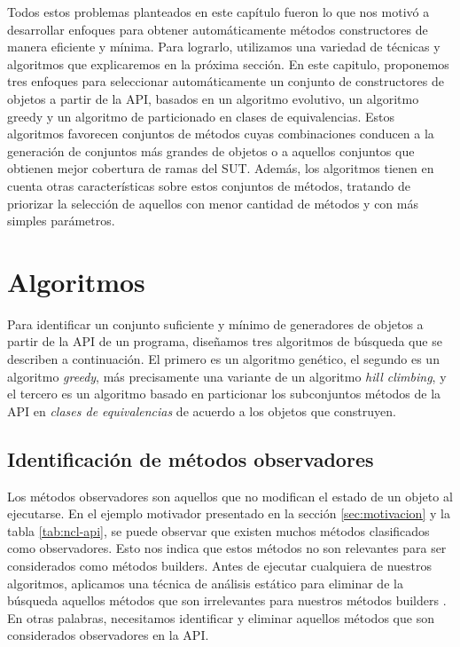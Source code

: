 Todos estos problemas planteados en este capítulo fueron lo que nos motivó a desarrollar enfoques para obtener automáticamente métodos constructores de manera eficiente y mínima. Para lograrlo, utilizamos una variedad de técnicas y algoritmos que explicaremos en la próxima sección. 
En este capitulo, proponemos tres enfoques para seleccionar automáticamente un
conjunto de constructores de objetos a partir de la API, basados en un algoritmo
evolutivo, un algoritmo greedy y un algoritmo de particionado en clases de equivalencias. Estos algoritmos favorecen conjuntos de métodos cuyas combinaciones conducen a la generación de conjuntos más grandes de objetos o a aquellos conjuntos que obtienen mejor cobertura de ramas del SUT. Además, los algoritmos tienen en cuenta otras características sobre estos conjuntos de métodos, tratando de priorizar la selección de aquellos con menor cantidad de métodos y con más simples parámetros.

\section{Algoritmos}
\label{sec:algorithms}

Para identificar un conjunto suficiente y mínimo de generadores de objetos a partir
de la API de un programa, diseñamos tres algoritmos de búsqueda que se
describen a continuación. El primero es un algoritmo genético, el segundo es un algoritmo \emph{greedy}, más precisamente una variante de un algoritmo \emph{hill climbing}, y el tercero
es un algoritmo basado en particionar los subconjuntos métodos de la API en \emph{clases de equivalencias} de acuerdo a los objetos que construyen.


\subsection{Identificación de métodos observadores}
Los métodos observadores son aquellos que no modifican el estado de un objeto al
ejecutarse. En el ejemplo motivador presentado en la sección
\ref{sec:motivacion} y la tabla \ref{tab:ncl-api}, se puede observar que existen
muchos métodos clasificados como observadores. Esto nos indica que estos métodos
no son relevantes para ser considerados como métodos builders. Antes de ejecutar
cualquiera de nuestros algoritmos, aplicamos una técnica de análisis estático
para eliminar de la búsqueda aquellos métodos que son irrelevantes para nuestros
métodos builders . En otras palabras, necesitamos identificar y eliminar aquellos métodos que son considerados observadores en la API.

